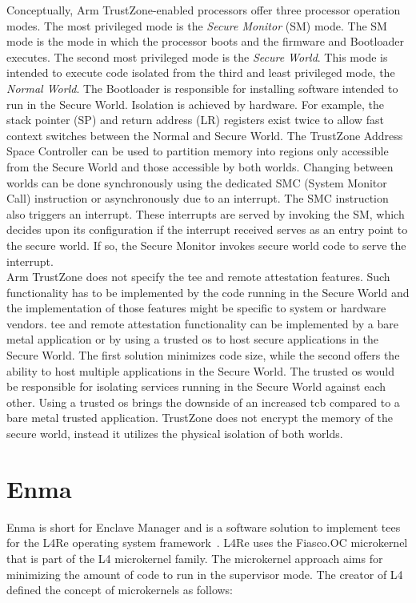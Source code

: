 Conceptually, Arm TrustZone-enabled processors offer three processor operation
modes. The most privileged mode is the \textit{Secure Monitor} (SM) mode. The SM
mode is the mode in which the processor boots and the firmware and Bootloader
executes. The second most privileged mode is the \textit{Secure World}. This
mode is intended to execute code isolated from the third and least privileged
mode, the \textit{Normal World}. The Bootloader is responsible for installing
software intended to run in the Secure World. Isolation is achieved by hardware.
For example, the stack pointer (SP) and return address (LR) registers exist
twice to allow fast context switches between the Normal and Secure World. The
TrustZone Address Space Controller can be used to partition memory into regions
only accessible from the Secure World and those accessible by both worlds.
Changing between worlds can be done synchronously using the dedicated SMC
(System Monitor Call) instruction or asynchronously due to an interrupt. The SMC
instruction also triggers an interrupt. These interrupts are served by invoking
the SM, which decides upon its configuration if the interrupt received serves as
an entry point to the secure world. If so, the Secure Monitor invokes secure
world code to serve the interrupt.\\

Arm TrustZone does not specify the \gls{tee} and remote attestation features.
Such functionality has to be implemented by the code running in the Secure World
and the implementation of those features might be specific to system or
hardware vendors. \gls{tee} and remote attestation functionality can be
implemented by a bare metal application or by using a trusted \gls{os} to host
secure applications in the Secure World. The first solution minimizes code size,
while the second offers the ability to host multiple applications in the Secure
World. The trusted \gls{os} would be responsible for isolating services running
in the Secure World against each other. Using a trusted \gls{os} brings the
downside of an increased \gls{tcb} compared to a bare metal trusted application.
TrustZone does not encrypt the memory of the secure world, instead it utilizes
the physical isolation of both worlds.\\

\section{Enma}
\label{sec:20:enma}
Enma is short for Enclave Manager and is a software solution to implement
\glspl{tee} for the L4Re operating system
framework~\cite{reitz_isolierende_2019}. L4Re uses the Fiasco.OC microkernel
that is part of the L4 microkernel family. The microkernel approach aims for
minimizing the amount of code to run in the supervisor mode. The creator of L4
defined the concept of microkernels as follows:

